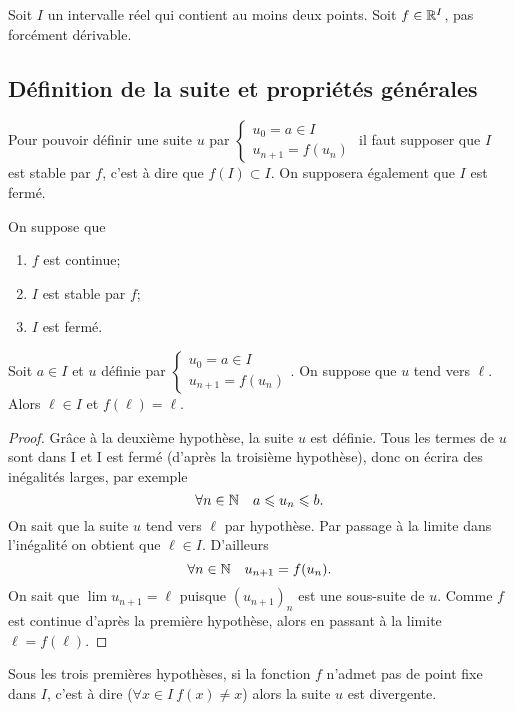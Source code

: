Soit \(I\) un intervalle réel qui contient au moins deux points. Soit \(f \in 
\mathbb{R}^I\), pas forcément dérivable.

\subsection{Définition de la suite et propriétés générales}

Pour pouvoir définir une suite \(u\) par \(\begin{cases} u_0=a \in I \\ 
u_{n+1}=f(u_n) \end{cases}\) il faut supposer que \(I\) est stable par \(f\), 
c'est à dire que \(f(I) \subset I\). On supposera également que \(I\) est fermé.

\begin{prop}
  On suppose que \begin{enumerate}
    \item \(f\) est continue;
    \item \(I\) est stable par \(f\);
    \item \(I\) est fermé.
  \end{enumerate}
  Soit \(a \in I\) et \(u\) définie par \(\begin{cases} u_0=a \in I \\ 
  u_{n+1}=f(u_n) \end{cases}\). On suppose que \(u\) tend vers \(\ell\). Alors 
  \(\ell \in I\) et \(f(\ell)=\ell\).
\end{prop}
\begin{proof}
  Grâce à la deuxième hypothèse, la suite \(u\) est définie. Tous les termes de 
  \(u\) sont dans I et I est fermé (d'après la troisième hypothèse), donc on 
  écrira des inégalités larges, par exemple
  \begin{equation}
    \forall n \in \mathbb{N} \quad a \leqslant u_n \leqslant b.
  \end{equation}
  On sait que la suite \(u\) tend vers \(\ell\) par hypothèse. Par passage à la 
  limite dans l'inégalité on obtient que \(\ell \in I\). D'ailleurs
  \begin{equation}
    \forall n \in \mathbb{N} \quad u_{n+1}=f(u_n).
  \end{equation}
  On sait que \(\lim u_{n+1}=\ell\) puisque \((u_{n+1})_n\) est une sous-suite 
  de \(u\). Comme \(f\) est continue d'après la première hypothèse, alors en 
  passant à la limite \(\ell=f(\ell)\).
\end{proof}

Sous les trois premières hypothèses, si la fonction \(f\) n'admet pas de point 
fixe dans \(I\), c'est à dire (\(\forall x \in I \ f(x) \neq x\)) alors la suite 
\(u\) est divergente.

